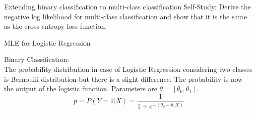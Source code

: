 \documentclass{beamer}
\begin{document}
\begin{frame}{Extending binary classification to multi-class classification}
   Self-Study: Derive the negative log likelihood for multi-class classification and show that it is the same as the cross entropy loss function.

    
\end{frame}

\begin{frame}{MLE for Logistic Regression}
                
                
            
            






Binary Classification:\\
The probability distribution in case of Logistic Regression considering two classes is Bernoulli distribution but there is a slight difference. The probability is now the output of the logistic function.
Parameters are $\theta=[\theta_0,\theta_1]$.
\begin{equation}
p = P(Y=1|X) = \frac{1}{1+e^{-(\theta_0+\theta_1X)}}
\end{equation}


\end{frame}
\end{document}
